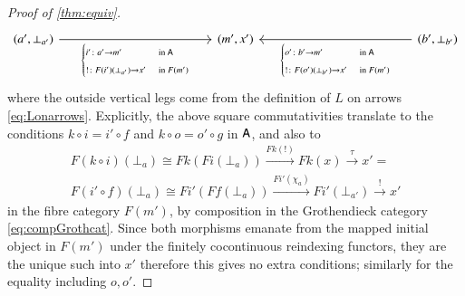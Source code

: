 \documentclass[reqno]{amsart}
\begin{document}
\begin{proof}[Proof of \cref{thm:equiv}]
\begin{equation}
\begin{tikzcd}[row sep=1in,column sep=1.7in,ampersand replacement=\&]
 (a',\bot_{a'})\ar[r,"{\begin{cases}i'\maps a'\to m' &\textrm{in }\A \\!\maps F(i')(\bot_{a'})\to x' &\textrm{in }F(m')\end{cases}}"'] \& (m',x') \& (b',\bot_{b'})\ar[l,"{\begin{cases}o'\maps b'\to m' &\textrm{in }\A \\!\maps F(o')(\bot_{b'})\to x' &\textrm{in }F(m')\end{cases}}"]
 \end{tikzcd}
\end{equation}
where the outside vertical legs come from the definition of $L$ on arrows \cref{eq:Lonarrows}. 
Explicitly, the above square commutativities translate to the conditions $k\circ i=i'\circ f$ and $k\circ o=o'\circ g$ in $\mathsf{A}$, and also to
\begin{gather}\label{eq:Grothcommutativity}
 F(k\circ i)(\bot_a)\cong Fk(Fi(\bot_a))\xrightarrow{Fk(!)}Fk(x)\xrightarrow{\tau}x'= \\
 F(i'\circ f)(\bot_a)\cong Fi'(Ff(\bot_a))\xrightarrow{Fi'(\chi_a)}Fi'(\bot_{a'})\xrightarrow{!}x'\nonumber
\end{gather}
in the fibre category $F(m')$, by composition in the Grothendieck category \cref{eq:compGrothcat}. Since both morphisms emanate from the mapped initial object in $F(m')$ under the finitely cocontinuous reindexing functors, they are the unique such into $x'$ therefore this gives no extra conditions; similarly for the equality including $o,o'$.


\end{proof}
\end{document}
